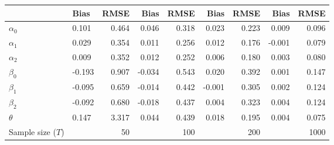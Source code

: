 
\begin{tabular}[t]{llrrrrrrr}
\toprule
  & Bias & RMSE & Bias & RMSE & Bias & RMSE & Bias & RMSE\\
\midrule
$\alpha_{0}$ & 0.101 & 0.464 & 0.046 & 0.318 & 0.023 & 0.223 & 0.009 & 0.096\\
$\alpha_{1}$ & 0.029 & 0.354 & 0.011 & 0.256 & 0.012 & 0.176 & -0.001 & 0.079\\
$\alpha_{2}$ & 0.009 & 0.352 & 0.012 & 0.252 & 0.006 & 0.180 & 0.003 & 0.080\\
$\beta_{0}$ & -0.193 & 0.907 & -0.034 & 0.543 & 0.020 & 0.392 & 0.001 & 0.147\\
$\beta_{1}$ & -0.095 & 0.659 & -0.014 & 0.442 & -0.001 & 0.305 & 0.002 & 0.124\\
$\beta_{2}$ & -0.092 & 0.680 & -0.018 & 0.437 & 0.004 & 0.323 & 0.004 & 0.124\\
$\theta$ & 0.147 & 3.317 & 0.044 & 0.439 & 0.018 & 0.195 & 0.004 & 0.075\\
Sample size ($T$) &  & 50 &  & 100 &  & 200 &  & 1000\\
\bottomrule
\end{tabular}
